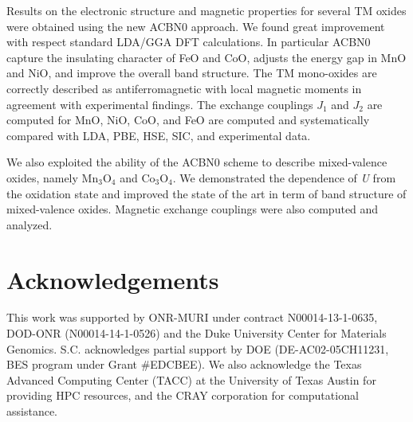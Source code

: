 \documentclass[12pt,a4paper,final]{iopart}
\begin{document}
Results on the electronic structure and magnetic properties for several TM oxides were obtained using the new ACBN0 approach. We found great improvement with respect standard LDA/GGA DFT calculations. In particular ACBN0 capture the insulating character of FeO and CoO, adjusts the energy gap in MnO and NiO, and improve the overall band structure. The TM mono-oxides are correctly described as antiferromagnetic with local magnetic moments in agreement with experimental findings. The exchange couplings $J_1$ and $J_2$ are computed for MnO, NiO, CoO, and FeO are computed and systematically compared with LDA, PBE, HSE, SIC, and experimental data.

We also exploited the ability of the ACBN0 scheme to describe mixed-valence oxides, namely Mn$_3$O$_4$ and Co$_3$O$_4$. We demonstrated the dependence of \textit{U} from the oxidation state and improved the state of the art in term of band structure of mixed-valence oxides. Magnetic exchange couplings were also computed and analyzed.

\section*{Acknowledgements}

This work was supported by ONR-MURI under contract N00014-13-1-0635, DOD-ONR (N00014-14-1-0526) and the Duke University Center for Materials Genomics.
S.C. acknowledges partial support by DOE (DE-AC02-05CH11231, BES program under Grant \#EDCBEE).
We also acknowledge the Texas Advanced Computing Center (TACC) at the University of Texas Austin for providing HPC resources,
 and the CRAY corporation for computational assistance.
 
\newpage
\end{document}
